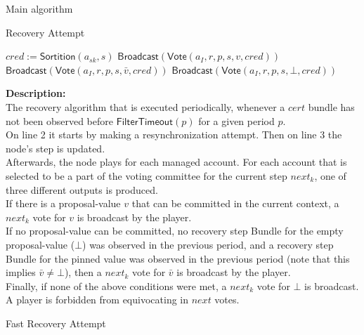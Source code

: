 \documentclass[10pt,a4paper]{article}
\begin{document}
\begin{section}{Main algorithm}
\begin{subsection}{Recovery Attempt}
\begin{algorithm}[H]
\begin{algorithmic}[1]
            \State $cred := 
            \mathsf{\mathsf{Sortition}}(a_{sk}, s)$
                    \State $\mathsf{Broadcast}(\mathsf{Vote}(a_I, r, p, s, v, cred))$
                    \State $\mathsf{Broadcast}(\mathsf{Vote}(a_I, r, p, s, \bar{v}, cred))$
                \Else
                    \State $\mathsf{Broadcast}(\mathsf{Vote}(a_I, r, p, s, \bot, cred))$
                \EndIf
            \EndIf
        \EndFor
        \EndFunction
        \end{algorithmic}
    \end{algorithm}
    
    
    \noindent \textbf{Description:}\\
The recovery algorithm that is executed periodically,
whenever a $cert$ bundle has not been observed before $\mathsf{FilterTimeout}(p)$ for a given period $p$. \\
On line 2 it starts by making a resynchronization attempt. Then on line 3 the node's step is updated.\\
Afterwards, the node plays for each managed account. For each account that is selected to be a part of the voting committee for the current
step $next_k$, one of three different outputs is produced. \\
If there is a proposal-value $v$ that can be committed in the current context, a $next_k$ vote for $v$ is broadcast by the player. \\
If no proposal-value can be committed, no recovery step Bundle for the empty proposal-value ($\bot$) was observed in the 
previous period, and a recovery step Bundle for the pinned value was observed in the previous period (note that this implies $\bar{v} \neq \bot$),
then a $next_k$ vote for $\bar{v}$ is broadcast by the player. \\
Finally, if none of the above conditions were met, a $next_k$ vote for $\bot$ is broadcast. A player is forbidden
from equivocating in $next$ votes.

\end{subsection}


\begin{subsection}{Fast Recovery Attempt}\label{ssect:FastRecovery}


\end{subsection}
\end{section}
\end{document}
